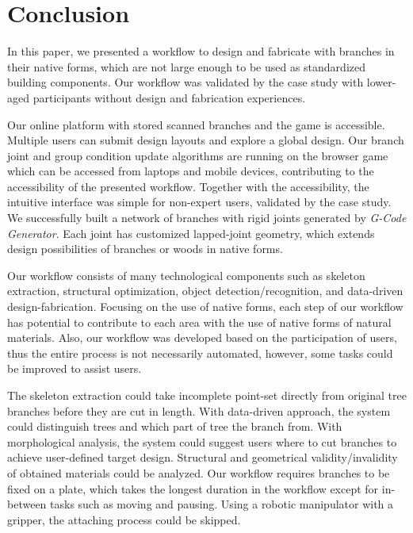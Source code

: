 \section{Conclusion}
In this paper, we presented a workflow to design and fabricate with branches in their native forms, which are not large enough to be used as standardized building components.
Our workflow was validated by the case study with lower-aged participants without design and fabrication experiences.

Our online platform with stored scanned branches and the game is accessible.
Multiple users can submit design layouts and explore a global design. %
Our branch joint and group condition update algorithms are running on the browser game which can be accessed from laptops and mobile devices, contributing to the accessibility of the presented workflow.
Together with the accessibility, the intuitive interface was simple for non-expert users, validated by the case study.
We successfully built a network of branches with rigid joints generated by \textit{G-Code Generator}.
Each joint has customized lapped-joint geometry, which extends design possibilities of branches or woods in native forms.

Our workflow consists of many technological components such as skeleton extraction, structural optimization, object detection/recognition, and data-driven design-fabrication.
Focusing on the use of native forms, each step of our workflow has potential to contribute to each area with the use of native forms of natural materials.
Also, our workflow was developed based on the participation of users, thus the entire process is not necessarily automated, however, some tasks could be improved to assist users.

The skeleton extraction could take incomplete point-set directly from original tree branches before they are cut in length.
With data-driven approach, the system could distinguish trees and which part of tree the branch from.
With morphological analysis, the system could suggest users where to cut branches to achieve user-defined target design.
Structural and geometrical validity/invalidity of obtained materials could be analyzed.
Our workflow requires branches to be fixed on a plate, which takes the longest duration in the workflow except for in-between tasks such as moving and pausing.
Using a robotic manipulator with a gripper, the attaching process could be skipped.


